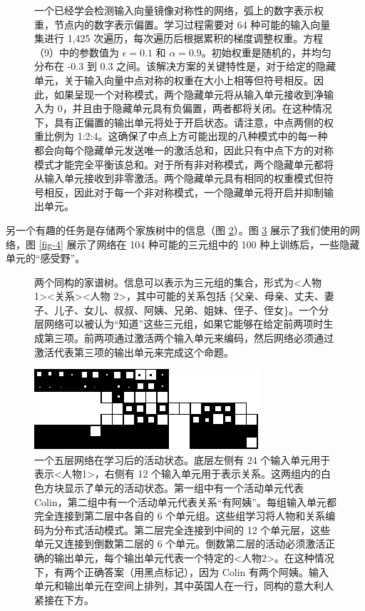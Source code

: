 \documentclass[lang=cn,a4paper,newtx]{elegantpaper}
\begin{document}
\begin{figure}
  \begingroup
  \endgroup
  \centering
  \caption{一个已经学会检测输入向量镜像对称性的网络，弧上的数字表示权重，节点内的数字表示偏置。学习过程需要对 64 种可能的输入向量集进行 1,425 次遍历，每次遍历后根据累积的梯度调整权重。方程（9）中的参数值为 \(\epsilon = 0.1\) 和 \(\alpha = 0.9\)。初始权重是随机的，并均匀分布在 -0.3 到 0.3 之间。该解决方案的关键特性是，对于给定的隐藏单元，关于输入向量中点对称的权重在大小上相等但符号相反。因此，如果呈现一个对称模式，两个隐藏单元将从输入单元接收到净输入为 0，并且由于隐藏单元具有负偏置，两者都将关闭。在这种情况下，具有正偏置的输出单元将处于开启状态。请注意，中点两侧的权重比例为 1:2:4。这确保了中点上方可能出现的八种模式中的每一种都会向每个隐藏单元发送唯一的激活总和，因此只有中点下方的对称模式才能完全平衡该总和。对于所有非对称模式，两个隐藏单元都将从输入单元接收到非零激活。两个隐藏单元具有相同的权重模式但符号相反，因此对于每一个非对称模式，一个隐藏单元将开启并抑制输出单元。}
  \label{fig-1}
\end{figure}

另一个有趣的任务是存储两个家族树中的信息（图 \ref{fig-2}）。图 \ref{fig-3} 展示了我们使用的网络，图 \ref{fig-4} 展示了网络在 104 种可能的三元组中的 100 种上训练后，一些隐藏单元的“感受野”。

\begin{figure}
  \begingroup
  \endgroup
  \centering
  \caption{两个同构的家谱树。信息可以表示为三元组的集合，形式为<人物 1><关系><人物 2>，其中可能的关系包括 \{父亲、母亲、丈夫、妻子、儿子、女儿、叔叔、阿姨、兄弟、姐妹、侄子、侄女\}。一个分层网络可以被认为“知道”这些三元组，如果它能够在给定前两项时生成第三项。前两项通过激活两个输入单元来编码，然后网络必须通过激活代表第三项的输出单元来完成这个命题。}
  \label{fig-2}
\end{figure}

\begin{figure}
  \centering
  \includegraphics{fig-3.pdf}
  \caption{一个五层网络在学习后的活动状态。底层左侧有 24 个输入单元用于表示<人物1>，右侧有 12 个输入单元用于表示关系。这两组内的白色方块显示了单元的活动状态。第一组中有一个活动单元代表 Colin，第二组中有一个活动单元代表关系“有阿姨”。每组输入单元都完全连接到第二层中各自的 6 个单元组。这些组学习将人物和关系编码为分布式活动模式。第二层完全连接到中间的 12 个单元层，这些单元又连接到倒数第二层的 6 个单元。倒数第二层的活动必须激活正确的输出单元，每个输出单元代表一个特定的<人物2>。在这种情况下，有两个正确答案（用黑点标记），因为 Colin 有两个阿姨。输入单元和输出单元在空间上排列，其中英国人在一行，同构的意大利人紧接在下方。}
  \label{fig-3}
\end{figure}
\end{document}
